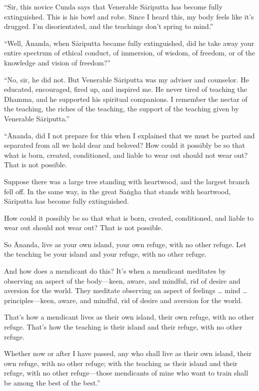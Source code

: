 \documentclass[12pt,openany]{book}%
\begin{document}
“Sir, this novice Cunda says that Venerable \textsanskrit{Sāriputta} has become fully extinguished. This is his bowl and robe. Since I heard this, my body feels like it’s drugged. I’m disorientated, and the teachings don’t spring to mind.” 

“Well, Ānanda, when \textsanskrit{Sāriputta} became fully extinguished, did he take away your entire spectrum of ethical conduct, of immersion, of wisdom, of freedom, or of the knowledge and vision of freedom?” 

“No, sir, he did not. But Venerable \textsanskrit{Sāriputta} was my adviser and counselor. He educated, encouraged, fired up, and inspired me. He never tired of teaching the Dhamma, and he supported his spiritual companions. I remember the nectar of the teaching, the riches of the teaching, the support of the teaching given by Venerable \textsanskrit{Sāriputta}.” 

“Ānanda, did I not prepare for this when I explained that we must be parted and separated from all we hold dear and beloved? How could it possibly be so that what is born, created, conditioned, and liable to wear out should not wear out? That is not possible. 

Suppose there was a large tree standing with heartwood, and the largest branch fell off. In the same way, in the great \textsanskrit{Saṅgha} that stands with heartwood, \textsanskrit{Sāriputta} has become fully extinguished. 

How could it possibly be so that what is born, created, conditioned, and liable to wear out should not wear out? That is not possible. 

So Ānanda, live as your own island, your own refuge, with no other refuge. Let the teaching be your island and your refuge, with no other refuge. 

And how does a mendicant do this? It’s when a mendicant meditates by observing an aspect of the body—keen, aware, and mindful, rid of desire and aversion for the world. They meditate observing an aspect of feelings … mind … principles—keen, aware, and mindful, rid of desire and aversion for the world. 

That’s how a mendicant lives as their own island, their own refuge, with no other refuge. That’s how the teaching is their island and their refuge, with no other refuge. 

Whether now or after I have passed, any who shall live as their own island, their own refuge, with no other refuge; with the teaching as their island and their refuge, with no other refuge—those mendicants of mine who want to train shall be among the best of the best.” 
\end{document}
